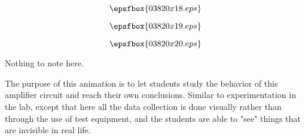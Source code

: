 \vfil \eject
$$\epsfbox{03820x18.eps}$$

\vfil \eject
$$\epsfbox{03820x19.eps}$$

\vfil \eject
$$\epsfbox{03820x20.eps}$$


\vfil \eject







Nothing to note here.







The purpose of this animation is to let students study the behavior of this amplifier circuit and reach their own conclusions.  Similar to experimentation in the lab, except that here all the data collection is done visually rather than through the use of test equipment, and the students are able to "see" things that are invisible in real life.




